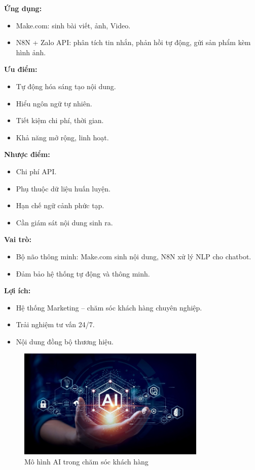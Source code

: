 \textbf{Ứng dụng:}
\begin{itemize}
    \item Make.com: sinh bài viết, ảnh, Video.
    \item N8N + Zalo API: phân tích tin nhắn, phản hồi tự động, gửi sản phẩm kèm hình ảnh.
\end{itemize}

\textbf{Ưu điểm:}
\begin{itemize}
    \item Tự động hóa sáng tạo nội dung.
    \item Hiểu ngôn ngữ tự nhiên.
    \item Tiết kiệm chi phí, thời gian.
    \item Khả năng mở rộng, linh hoạt.
\end{itemize}

\textbf{Nhược điểm:}
\begin{itemize}
    \item Chi phí API.
    \item Phụ thuộc dữ liệu huấn luyện.
    \item Hạn chế ngữ cảnh phức tạp.
    \item Cần giám sát nội dung sinh ra.
\end{itemize}

\textbf{Vai trò:}
\begin{itemize}
    \item Bộ não thông minh: Make.com sinh nội dung, N8N xử lý NLP cho chatbot.
    \item Đảm bảo hệ thống tự động và thông minh.
\end{itemize}

\textbf{Lợi ích:}
\begin{itemize}
    \item Hệ thống Marketing – chăm sóc khách hàng chuyên nghiệp.
    \item Trải nghiệm tư vấn 24/7.
    \item Nội dung đồng bộ thương hiệu.
\end{itemize}

\begin{figure}
\centering
    \includegraphics[width=0.8\textwidth]{img/Picture2.png}
    
    \caption{Mô hình AI trong chăm sóc khách hàng}
    \label{fig:chamsoc}
\end{figure}

